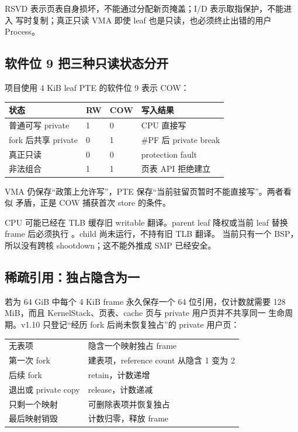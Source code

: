 RSVD 表示页表自身损坏，不能通过分配新页掩盖；I/D 表示取指保护，不能进入
写时复制；真正只读 VMA 即使 leaf 也是只读，也必须终止出错的用户 Process。

\subsection{软件位 9 把三种只读状态分开}

项目使用 4 KiB leaf PTE 的软件位 9 表示 COW：

\begin{longtable}{L{0.29\textwidth}L{0.12\textwidth}L{0.12\textwidth}L{0.28\textwidth}}
\toprule
\textbf{状态} & \textbf{RW} & \textbf{COW} & \textbf{写入结果}\\
\midrule
普通可写 private & 1 & 0 & CPU 直接写\\
fork 后共享 private & 0 & 1 & \#PF 后 private break\\
真正只读 & 0 & 0 & protection fault\\
非法组合 & 1 & 1 & 页表 API 拒绝建立\\
\bottomrule
\end{longtable}

VMA 仍保存“政策上允许写”，PTE 保存“当前驻留页暂时不能直接写”。两者看似
矛盾，正是 COW 捕获首次 store 的条件。

CPU 可能已经在 TLB 缓存旧 writable 翻译。parent leaf 降权或当前 leaf
替换 frame 后必须执行 。child 尚未运行，不持有旧 TLB 翻译。
当前只有一个 BSP，所以没有跨核 shootdown；这不能外推成 SMP 已经安全。

\subsection{稀疏引用：独占隐含为一}

若为 64 GiB 中每个 4 KiB frame 永久保存一个 64 位引用，仅计数就需要
128 MiB，而且 KernelStack、页表、cache 页与 private 用户页并不共享同一
生命周期。v1.10 只登记“经历 fork 后尚未恢复独占”的 private 用户页：

\begin{center}
\begin{tabular}{ll}
无表项 & 隐含一个映射独占 frame\\
第一次 fork & 建表项，reference count 从隐含 1 变为 2\\
后续 fork & retain，计数递增\\
退出或 private copy & release，计数递减\\
只剩一个映射 & 可删除表项并恢复独占\\
最后映射销毁 & 计数归零，释放 frame\\
\end{tabular}
\end{center}

